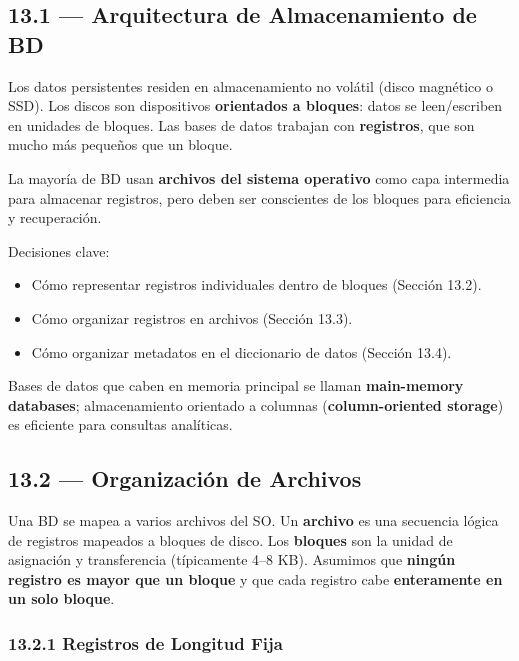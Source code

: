 \documentclass[11pt, a4paper]{article}
\begin{document}
\subsection{13.1 --- Arquitectura de Almacenamiento de BD}

Los datos persistentes residen en almacenamiento no volátil (disco magnético o SSD). Los discos son dispositivos \textbf{orientados a bloques}: datos se leen/escriben en unidades de bloques. Las bases de datos trabajan con \textbf{registros}, que son mucho más pequeños que un bloque.

La mayoría de BD usan \textbf{archivos del sistema operativo} como capa intermedia para almacenar registros, pero deben ser conscientes de los bloques para eficiencia y recuperación.

Decisiones clave:
\begin{itemize}[nosep]
	\item Cómo representar registros individuales dentro de bloques (Sección 13.2).
	\item Cómo organizar registros en archivos (Sección 13.3).
	\item Cómo organizar metadatos en el diccionario de datos (Sección 13.4).
\end{itemize}

Bases de datos que caben en memoria principal se llaman \textbf{main-memory databases}; almacenamiento orientado a columnas (\textbf{column-oriented storage}) es eficiente para consultas analíticas.

\subsection{13.2 --- Organización de Archivos}

Una BD se mapea a varios archivos del SO. Un \textbf{archivo} es una secuencia lógica de registros mapeados a bloques de disco. Los \textbf{bloques} son la unidad de asignación y transferencia (típicamente 4--8 KB). Asumimos que \textbf{ningún registro es mayor que un bloque} y que cada registro cabe \textbf{enteramente en un solo bloque}.

\subsubsection{13.2.1 Registros de Longitud Fija}
\end{document}
